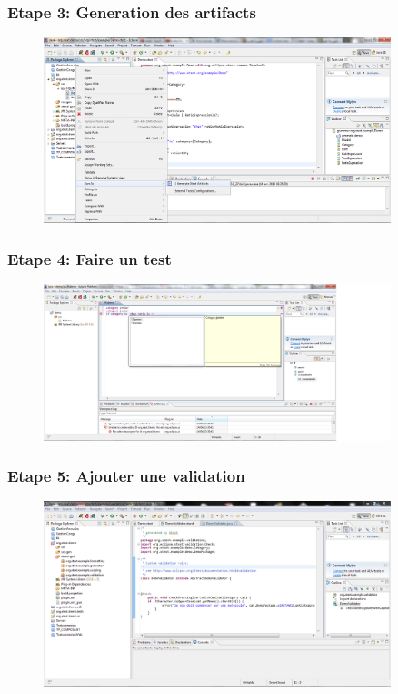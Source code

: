 \documentclass{beamer}
\begin{document}
	\begin{frame}
	\frametitle{Etape 3: Generation des artifacts}
	\begin{figure}[h]
	\centering
			\includegraphics[width=0.90\textwidth]{3.PNG}
	\label{fig:3}
\end{figure}

\end{frame} 
	\begin{frame}
	\frametitle{Etape 4: Faire un test}
	\begin{figure}[h]
	\centering
			\includegraphics[width=0.90\textwidth]{4.PNG}
	\label{fig:4}
	\end{figure}

\end{frame} 	\begin{frame}
	\frametitle{Etape 5: Ajouter une validation}
	\begin{figure}[h]
	\centering
			\includegraphics[width=0.90\textwidth]{5.PNG}
	\label{fig:5}
\end{figure}

\end{frame} 
\end{document}
